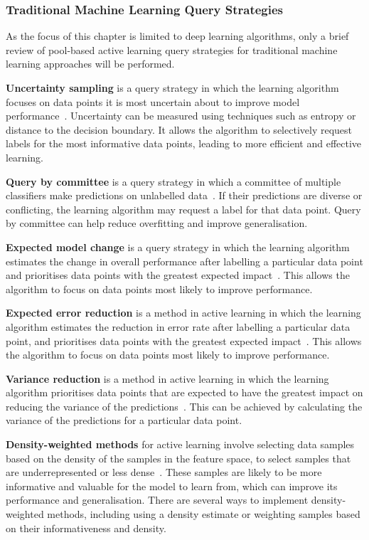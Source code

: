 \subsubsection{Traditional Machine Learning Query Strategies}
As the focus of this chapter is limited to deep learning algorithms, only a brief review of pool-based active learning query strategies for traditional machine learning approaches will be performed.

\textbf{Uncertainty sampling} is a query strategy in which the learning algorithm focuses on data points it is most uncertain about to improve model performance~\citep{lewis1995sequential}. Uncertainty can be measured using techniques such as entropy or distance to the decision boundary. It allows the algorithm to selectively request labels for the most informative data points, leading to more efficient and effective learning. 

\textbf{Query by committee} is a query strategy in which a committee of multiple classifiers make predictions on unlabelled data~\citep{seung1992query}. If their predictions are diverse or conflicting, the learning algorithm may request a label for that data point. Query by committee can help reduce overfitting and improve generalisation.

\textbf{Expected model change} is a query strategy in which the learning algorithm estimates the change in overall performance after labelling a particular data point and prioritises data points with the greatest expected impact~\citep{settles2007multiple}. This allows the algorithm to focus on data points most likely to improve performance.

\textbf{Expected error reduction} is a method in active learning in which the learning algorithm estimates the reduction in error rate after labelling a particular data point, and prioritises data points with the greatest expected impact~\citep{roy2001toward}. This allows the algorithm to focus on data points most likely to improve performance. 

\textbf{Variance reduction} is a method in active learning in which the learning algorithm prioritises data points that are expected to have the greatest impact on reducing the variance of the predictions~\citep{cohn1996active}. This can be achieved by calculating the variance of the predictions for a particular data point. 

\textbf{Density-weighted methods} for active learning involve selecting data samples based on the density of the samples in the feature space, to select samples that are underrepresented or less dense~\citep{settles2008analysis}. These samples are likely to be more informative and valuable for the model to learn from, which can improve its performance and generalisation. There are several ways to implement density-weighted methods, including using a density estimate or weighting samples based on their informativeness and density.

